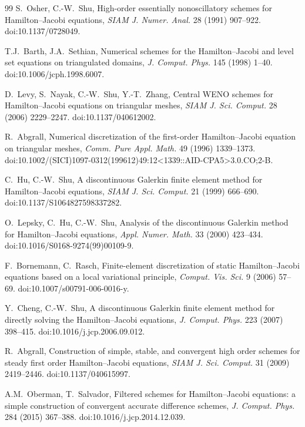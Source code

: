 \documentclass[preprint,12pt]{elsarticle}
\begin{document}
\begin{thebibliography}{99}
S.~Osher, C.-W.~Shu,
High-order essentially nonoscillatory schemes for Hamilton--Jacobi equations,
\emph{SIAM J. Numer. Anal.} 28 (1991) 907--922.
\newblock doi:10.1137/0728049.

T.J.~Barth, J.A.~Sethian,
Numerical schemes for the Hamilton--Jacobi and level set equations on triangulated domains,
\emph{J. Comput. Phys.} 145 (1998) 1--40.
\newblock doi:10.1006/jcph.1998.6007.

D.~Levy, S.~Nayak, C.-W.~Shu, Y.-T.~Zhang,
Central WENO schemes for Hamilton--Jacobi equations on triangular meshes,
\emph{SIAM J. Sci. Comput.} 28 (2006) 2229--2247.
\newblock doi:10.1137/040612002.

R.~Abgrall,
Numerical discretization of the first-order Hamilton--Jacobi equation on triangular meshes,
\emph{Comm. Pure Appl. Math.} 49 (1996) 1339--1373.
\newblock doi:10.1002/(SICI)1097-0312(199612)49:12<1339::AID-CPA5>3.0.CO;2-B.

C.~Hu, C.-W.~Shu,
A discontinuous Galerkin finite element method for Hamilton--Jacobi equations,
\emph{SIAM J. Sci. Comput.} 21 (1999) 666--690.
\newblock doi:10.1137/S1064827598337282.

O.~Lepsky, C.~Hu, C.-W.~Shu,
Analysis of the discontinuous Galerkin method for Hamilton--Jacobi equations,
\emph{Appl. Numer. Math.} 33 (2000) 423--434.
\newblock doi:10.1016/S0168-9274(99)00109-9.

F.~Bornemann, C.~Rasch,
Finite-element discretization of static Hamilton--Jacobi equations based on a local variational principle,
\emph{Comput. Vis. Sci.} 9 (2006) 57--69.
\newblock doi:10.1007/s00791-006-0016-y.

Y.~Cheng, C.-W.~Shu,
A discontinuous Galerkin finite element method for directly solving the Hamilton--Jacobi equations,
\emph{J. Comput. Phys.} 223 (2007) 398--415.
\newblock doi:10.1016/j.jcp.2006.09.012.

R.~Abgrall,
Construction of simple, stable, and convergent high order schemes for steady first order Hamilton--Jacobi equations,
\emph{SIAM J. Sci. Comput.} 31 (2009) 2419--2446.
\newblock doi:10.1137/040615997.

A.M.~Oberman, T.~Salvador,
Filtered schemes for Hamilton--Jacobi equations: a simple construction of convergent accurate difference schemes,
\emph{J. Comput. Phys.} 284 (2015) 367--388.
\newblock doi:10.1016/j.jcp.2014.12.039.


\end{thebibliography}
\end{document}
